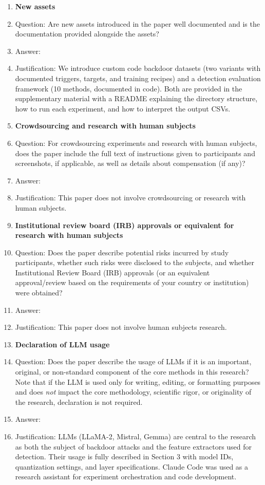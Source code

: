 \begin{enumerate}
\item {\bf New assets}
    \item[] Question: Are new assets introduced in the paper well documented and is the documentation provided alongside the assets?
    \item[] Answer: \answerYes{}
    \item[] Justification: We introduce custom code backdoor datasets (two variants with documented triggers, targets, and training recipes) and a detection evaluation framework (10 methods, documented in code). Both are provided in the supplementary material with a README explaining the directory structure, how to run each experiment, and how to interpret the output CSVs.

\item {\bf Crowdsourcing and research with human subjects}
    \item[] Question: For crowdsourcing experiments and research with human subjects, does the paper include the full text of instructions given to participants and screenshots, if applicable, as well as details about compensation (if any)?
    \item[] Answer: \answerNA{}
    \item[] Justification: This paper does not involve crowdsourcing or research with human subjects.

\item {\bf Institutional review board (IRB) approvals or equivalent for research with human subjects}
    \item[] Question: Does the paper describe potential risks incurred by study participants, whether such risks were disclosed to the subjects, and whether Institutional Review Board (IRB) approvals (or an equivalent approval/review based on the requirements of your country or institution) were obtained?
    \item[] Answer: \answerNA{}
    \item[] Justification: This paper does not involve human subjects research.

\item {\bf Declaration of LLM usage}
    \item[] Question: Does the paper describe the usage of LLMs if it is an important, original, or non-standard component of the core methods in this research? Note that if the LLM is used only for writing, editing, or formatting purposes and does \emph{not} impact the core methodology, scientific rigor, or originality of the research, declaration is not required.
    \item[] Answer: \answerYes{}
    \item[] Justification: LLMs (LLaMA-2, Mistral, Gemma) are central to the research as both the subject of backdoor attacks and the feature extractors used for detection. Their usage is fully described in Section 3 with model IDs, quantization settings, and layer specifications. Claude Code was used as a research assistant for experiment orchestration and code development.

\end{enumerate}
